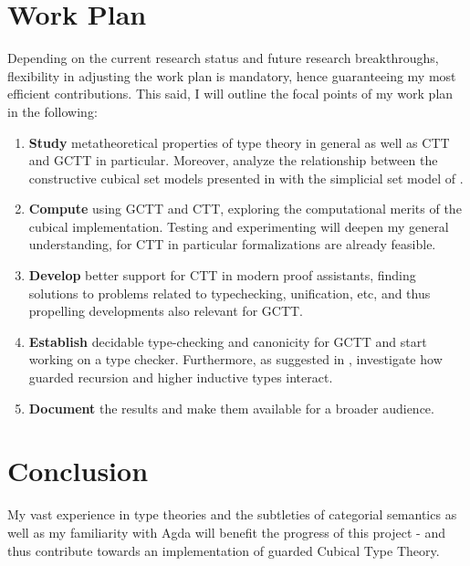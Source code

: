 \documentclass{article}
\begin{document}
\section{Work Plan}
Depending on the current research status and future research breakthroughs, flexibility in adjusting the work plan is mandatory, hence guaranteeing my most efficient contributions.
This said, I will outline the focal points of my work plan in the following:
\begin{enumerate}
	\item\textbf{Study} metatheoretical properties of type theory in general as well as CTT and GCTT in particular. Moreover, analyze the relationship between the constructive cubical set models presented in \cite{GCTT} with the simplicial set model of \cite{GITT}.


 	\item\textbf{Compute} using GCTT and CTT, exploring the computational merits of the cubical implementation.  
		Testing and experimenting will deepen my general understanding, 
for CTT in particular formalizations are already feasible.

	\item\textbf{Develop} better support for CTT in modern proof assistants, finding solutions to problems related to typechecking, unification, etc, and thus propelling developments also relevant for GCTT.

 	\item\textbf{Establish} decidable type-checking and canonicity for GCTT and start working on a type checker. Furthermore, as suggested in \cite{GCTT}, investigate how guarded recursion and higher inductive types interact. 


	\item\textbf{Document} the results and make them available for a broader audience. 	
\end{enumerate}
\section{Conclusion}
My vast experience in type theories and the subtleties of categorial semantics as well as my familiarity with Agda will benefit the progress of this project - and thus contribute towards an implementation of guarded Cubical Type Theory. 

\vspace{10em}


\end{document}
